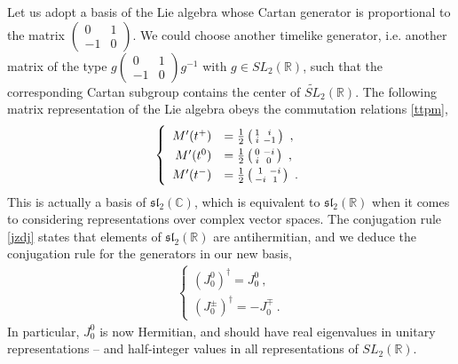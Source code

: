\documentclass[12pt, a4paper, notitlepage, twoside]{report}
\numberwithin{equation}{section}
\theoremstyle{break}
\begin{document}
Let us adopt a basis of the Lie algebra whose Cartan generator is proportional to the matrix $\left(\begin{smallmatrix} 0 & 1 \\ -1 & 0 \end{smallmatrix}\right)$. We could choose another timelike generator, i.e. another matrix of the type $g\left(\begin{smallmatrix} 0 & 1 \\ -1 & 0 \end{smallmatrix}\right) g^{-1}$ with $g\in SL_2({\mathbb{R}})$, such that the corresponding Cartan subgroup contains the center of $\widetilde{SL}_2(\mathbb{R})$. 
The following matrix representation of the Lie algebra obeys the commutation relations \eqref{ttpm},
\begin{align}
\renewcommand{\arraystretch}{1.3}
\left\{ \begin{array}{rl}
 M'(t^+)& = \frac12\left(\begin{smallmatrix} 1 & i \\ i& -1 \end{smallmatrix} \right) \ , 
\\
 M'(t^0) &= \frac{1}{2}\left(\begin{smallmatrix} 0 & -i \\ i & 0 \end{smallmatrix}\right)\ ,
\\
M'(t^-) & = \frac12\left(\begin{smallmatrix} 1 & -i \\ -i & 1 \end{smallmatrix} \right) \ .
\end{array} \right.
\label{mpta}
\end{align}
This is actually a basis of $\mathfrak{sl}_2(\mathbb{C})$, which is equivalent to $\mathfrak{sl}_2(\mathbb{R})$ when it comes to considering representations over complex vector spaces. The conjugation rule \eqref{jzdj} states that elements of $\mathfrak{sl}_2(\mathbb{R})$ are antihermitian, and we deduce the conjugation rule for the generators in our new basis, 
\begin{align}
 \left\{\begin{array}{l} (J_0^0)^\dagger = J_0^0\ , \\
         (J_0^\pm)^\dagger = -J_0^\mp \ .
        \end{array}
\right.
\label{jtdj}
\end{align}
In particular, $J_0^0$ is now Hermitian, and should have real eigenvalues in unitary representations -- and half-integer values in all representations of $SL_2(\mathbb{R})$.
\end{document}
